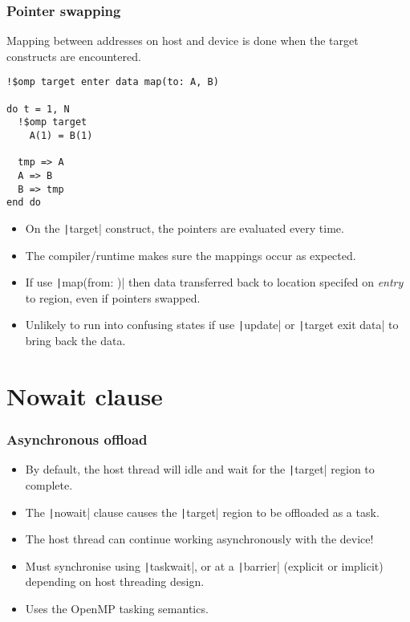 \documentclass[aspectratio=169]{beamer}
\begin{document}
\begin{frame}[fragile]
\frametitle{Pointer swapping}
Mapping between addresses on host and device is done when the target constructs are encountered.
\begin{verbatim}
!$omp target enter data map(to: A, B)

do t = 1, N
  !$omp target
    A(1) = B(1)
  
  tmp => A
  A => B
  B => tmp
end do
\end{verbatim}

\begin{itemize}
\item On the \texttt|target| construct, the pointers are evaluated every time.
\item The compiler/runtime makes sure the mappings occur as expected.
\item If use \texttt|map(from: )| then data transferred back to location specifed on \emph{entry} to region, even if pointers swapped.
\item Unlikely to run into confusing states if use \texttt|update| or \texttt|target exit data| to bring back the data.
\end{itemize}

\end{frame}

\section{Nowait clause}
\begin{frame}
\frametitle{Asynchronous offload}
\begin{itemize}
  \item By default, the host thread will idle and wait for the \texttt|target| region to complete.
  \item The \texttt|nowait| clause causes the \texttt|target| region to be offloaded as a task.
  \item The host thread can continue working asynchronously with the device!
  \item Must synchronise using \texttt|taskwait|, or at a \texttt|barrier| (explicit or implicit) depending on host threading design.
  \item Uses the OpenMP tasking semantics.
\end{itemize}
\end{frame}
\end{document}
